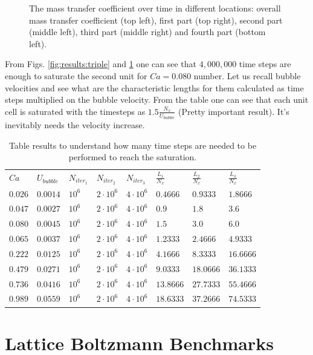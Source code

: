 \documentclass{article}
\begin{document}
\begin{figure}[htb!]
\caption{The mass transfer coefficient over time in different locations: overall mass transfer
coefficient (top left), first part (top right), second part (middle left), third part (middle
right) and fourth part (bottom left). \label{fig:results:quadro}}
\end{figure}

From Figs. \ref{fig:results:triple} and \ref{fig:results:quadro} one can see that $4,000,000$ time
steps are enough to saturate the second unit for $Ca=0.080$ number. Let us recall bubble velocities
and see what are the characteristic lengths for them calculated as time steps multiplied on the
bubble velocity. From the table one can see that each unit cell is saturated with the timesteps as
$1.5 \frac{N_x}{U_{bubble}}$ {\color{red}(Pretty important result)}. It's inevitably needs the
velocity increase.
\begin{table}[htb!]
\begin{tabularx}{\textwidth}{|X|X|X|X|X|X|X|X|}
\hline
$Ca$ &$U_{bubble}$ &$N_{iter_1}$ &$N_{iter_2}$ &$N_{iter_3}$ &$\frac{L_1}{N_x}$&$\frac{L_2}{N_x}$ 
&$\frac{L_3}{N_x}$\\
$0.026$&$0.0014$&$10^6$&$2\cdot10^6$&$4\cdot10^6$&$0.4666$ &$0.9333$ &$1.8666 $\\
$0.047$&$0.0027$&$10^6$&$2\cdot10^6$&$4\cdot10^6$&$0.9$    &$1.8$    &$3.6    $\\
$0.080$&$0.0045$&$10^6$&$2\cdot10^6$&$4\cdot10^6$&$1.5$    &$3.0$    &$6.0    $\\
$0.065$&$0.0037$&$10^6$&$2\cdot10^6$&$4\cdot10^6$&$1.2333$ &$2.4666$ &$4.9333 $\\
$0.222$&$0.0125$&$10^6$&$2\cdot10^6$&$4\cdot10^6$&$4.1666$ &$8.3333$ &$16.6666$\\
$0.479$&$0.0271$&$10^6$&$2\cdot10^6$&$4\cdot10^6$&$9.0333$ &$18.0666$&$36.1333$\\
$0.736$&$0.0416$&$10^6$&$2\cdot10^6$&$4\cdot10^6$&$13.8666$&$27.7333$&$55.4666$\\
$0.989$&$0.0559$&$10^6$&$2\cdot10^6$&$4\cdot10^6$&$18.6333$&$37.2666$&$74.5333$\\
\hline
\end{tabularx}
\caption{Table results to understand how many time steps are needed to be performed to reach the
saturation.\label{table:time:steps}}
\end{table}

\section{Lattice Boltzmann Benchmarks}
\end{document}
